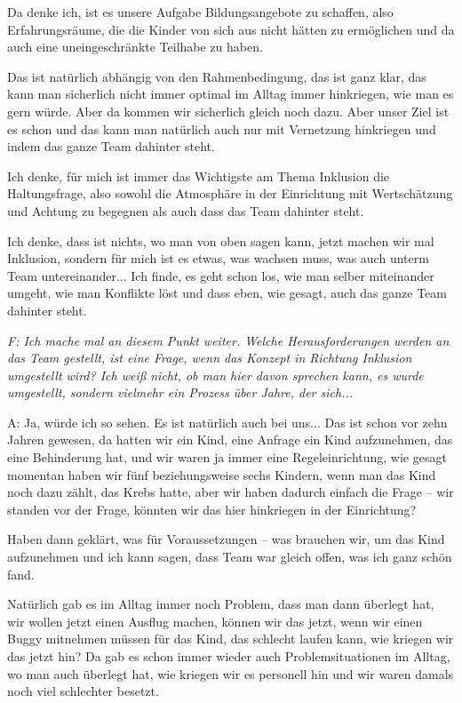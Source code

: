 \begin{linenumbers*}
Da denke ich, ist es unsere Aufgabe Bildungsangebote zu schaffen, also Erfahrungsräume, die die Kinder von sich aus nicht hätten zu ermöglichen und da auch eine uneingeschränkte Teilhabe zu haben. 

Das ist natürlich abhängig von den Rahmenbedingung, das ist ganz klar, das kann man sicherlich nicht immer optimal im Alltag immer hinkriegen, wie man es gern würde. Aber da kommen wir sicherlich gleich noch dazu. Aber unser Ziel ist es schon und das kann man natürlich auch nur mit Vernetzung hinkriegen und indem das ganze Team dahinter steht. 

Ich denke, für mich ist immer das Wichtigste am Thema Inklusion die Haltungsfrage, also sowohl die Atmosphäre in der Einrichtung mit Wertschätzung und Achtung zu begegnen als auch dass das Team dahinter steht. 

Ich denke, dass ist nichts, wo man von oben sagen kann, jetzt machen wir mal Inklusion, sondern für mich ist es etwas, was wachsen muss, was auch unterm Team untereinander... Ich finde, es geht schon los, wie man selber miteinander umgeht, wie man Konflikte löst und dass eben, wie gesagt, auch das ganze Team dahinter steht. 

\emph{F: Ich mache mal an diesem Punkt weiter. Welche Herausforderungen werden an das Team gestellt, ist eine Frage, wenn das Konzept in Richtung Inklusion umgestellt wird? Ich weiß nicht, ob man hier davon sprechen kann, es wurde umgestellt, sondern vielmehr ein Prozess über Jahre, der sich...}

A: Ja, würde ich so sehen. Es ist natürlich auch bei uns... Das ist schon vor zehn Jahren gewesen, da hatten wir ein Kind, eine Anfrage ein Kind aufzunehmen, das eine Behinderung hat, und wir waren ja immer eine Regeleinrichtung, wie gesagt momentan haben wir fünf beziehungsweise sechs Kindern, wenn man das Kind noch dazu zählt, das Krebs hatte, aber wir haben dadurch einfach die Frage -- wir standen vor der Frage, könnten wir das hier hinkriegen in der Einrichtung? 

Haben dann geklärt, was für Voraussetzungen -- was brauchen wir, um das Kind aufzunehmen und ich kann sagen, dass Team war gleich offen, was ich ganz schön fand. 

Natürlich gab es im Alltag immer noch Problem, dass man dann überlegt hat, wir wollen jetzt einen Ausflug machen, können wir das jetzt, wenn wir einen Buggy mitnehmen müssen für das Kind, das schlecht laufen kann, wie kriegen wir das jetzt hin? Da gab es schon immer wieder auch Problemsituationen im Alltag, wo man auch überlegt hat, wie kriegen wir es personell hin und wir waren damals noch viel schlechter besetzt. 


\end{linenumbers*}
